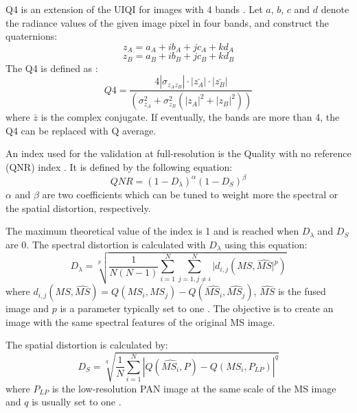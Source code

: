 \documentclass[12pt]{report}
\begin{document}
Q4 is an extension of the UIQI for images with 4 bands \cite{q4}. 
Let $a$, $b$, $c$ and $d$ denote the radiance values of the given image pixel in four bands, and construct the quaternions:
%
\begin{equation}
    z_A = a_A + ib_A + jc_A + kd_A
    \label{za}
\end{equation}
%
\begin{equation}
    z_B = a_B + ib_B + jc_B + kd_B
    \label{zb}
\end{equation}
%
The Q4 is defined as :
%
\begin{equation}
    Q4 = \frac{4 | \sigma_{z_A z_B}| \cdot |\bar{z_A}| \cdot |\bar{z_B}|}{(\sigma_{z_A}^2 + \sigma_{z_B}^2 (|z_A|^2 + |z_B|^2))}
    \label{q4}
\end{equation}
%
where $\bar{z}$ is the complex conjugate.
If eventually, the bands are more than 4, the Q4 can be replaced with Q average.

An index used for the validation at full-resolution is the Quality with no reference (QNR) index \cite{qnr}.
It is defined by the following equation:
%
\begin{equation}
    QNR = (1-D_{\lambda})^\alpha (1 - D_S)^\beta
    \label{qnr}
\end{equation}
%
$\alpha$ and $\beta$ are two coefficients which can be tuned to weight more
the spectral or the spatial distortion, respectively.

The maximum theoretical value of the index is 1 and is reached when $D_\lambda$ and $D_S$ are 0.
The spectral distortion is calculated with $D_\lambda$ using this equation:
%
\begin{equation}
    D_\lambda = \sqrt[p]{\frac{1}{N(N-1)} \sum_{i=1}^N \sum_{j=1, j \neq i}^N |d_{i,j}(MS, \widehat{MS}|^p)}
    \label{dl}
\end{equation}
%
where $d_{i,j}(MS, \widehat{MS}) = Q(MS_i, MS_j) - Q(\widehat{MS_i}, \widehat{MS_j})$, $\widehat{MS}$ is
the fused image and $p$ is a parameter typically set to one \cite{qnr}.
The objective is to create an image with the same spectral features of the original MS image.

The spatial distortion is calculated by:
%
\begin{equation}
    D_S = \sqrt[q]{\frac{1}{N} \sum_{i=1}^N |Q(\widehat{MS_i}, P) - Q(MS_i, P_{LP})|^q}
    \label{ds}
\end{equation}
%
where $P_{LP}$ is the low-resolution PAN image at the same scale of the MS image and $q$ is usually set to one \cite{qnr}.
\end{document}
